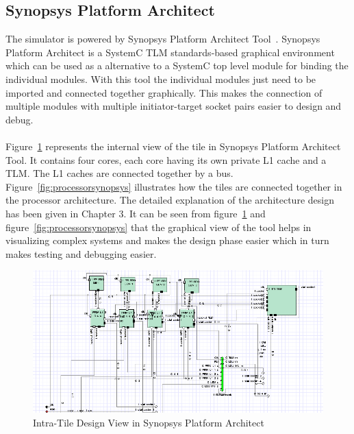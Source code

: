 \documentclass{listhesis}
\begin{document}
\subsection{Synopsys Platform Architect}
The simulator is powered by Synopsys Platform Architect Tool~\cite{synopsys}. Synopsys Platform Architect is a SystemC TLM standards-based graphical environment which can be used as a alternative to a SystemC top level module for binding the individual modules. With this tool the individual modules just need to be imported and connected together graphically. This makes the connection of multiple modules with multiple initiator-target socket pairs easier to design and debug.\\
\\ Figure~\ref{fig:insidetile} represents the internal view of the tile in Synopsys Platform Architect Tool. It contains four cores, each core having its own private L1 cache and a TLM. The L1 caches are connected together by a bus. Figure~\ref{fig:processorsynopsys} illustrates how the tiles are connected together in the processor architecture. The detailed explanation of the architecture design has been given in Chapter 3. It can be seen from figure~\ref{fig:insidetile} and figure~\ref{fig:processorsynopsys} that the graphical view of the tool helps in visualizing complex systems and makes the design phase easier which in turn makes testing and debugging easier.
\begin{figure}
  \includegraphics[width=\linewidth]{insidetile.png}
  \centering
  \caption{Intra-Tile Design View in Synopsys Platform Architect}
  \label{fig:insidetile}
\end{figure}
\end{document}
